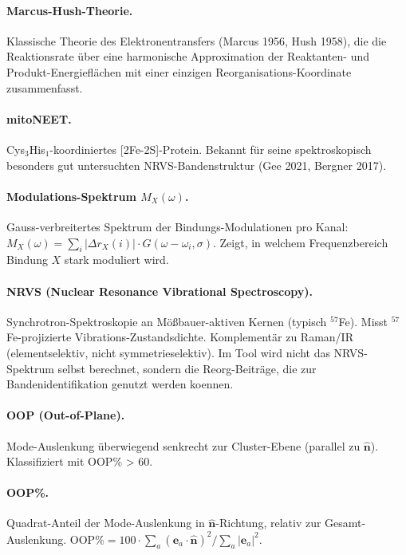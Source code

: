 \documentclass[11pt,a4paper,twoside]{article}
\theoremstyle{remark}
\begin{document}
\paragraph{Marcus-Hush-Theorie.}
Klassische Theorie des Elektronentransfers (Marcus 1956,
Hush 1958), die die Reaktionsrate \"uber eine harmonische
Approximation der Reaktanten- und Produkt-Energiefl\"achen mit
einer einzigen Reorganisations-Koordinate zusammenfasst.

\paragraph{mitoNEET.}
Cys$_3$His$_1$-koordiniertes [2Fe-2S]-Protein. Bekannt f\"ur
seine spektroskopisch besonders gut untersuchten NRVS-Bandenstruktur
(Gee 2021, Bergner 2017).

\paragraph{Modulations-Spektrum $M_X(\omega)$.}
Gauss-verbreitertes Spektrum der Bindungs-Modulationen pro Kanal:
$M_X(\omega) = \sum_i |\Delta r_X(i)| \cdot G(\omega - \omega_i,
\sigma)$. Zeigt, in welchem Frequenzbereich Bindung $X$ stark
moduliert wird.

\paragraph{NRVS (Nuclear Resonance Vibrational Spectroscopy).}
Synchrotron-Spektroskopie an M\"o{\ss}bauer-aktiven Kernen
(typisch $^{57}$Fe). Misst $^{57}$Fe-projizierte
Vibrations-Zustandsdichte. Komplement\"ar zu Raman/IR
(elementselektiv, nicht symmetrieselektiv). Im Tool wird
nicht das NRVS-Spektrum selbst berechnet, sondern die
Reorg-Beitr\"age, die zur Bandenidentifikation genutzt
werden koennen.

\paragraph{OOP (Out-of-Plane).}
Mode-Auslenkung \"uberwiegend senkrecht zur Cluster-Ebene
(parallel zu $\hat{\mathbf{n}}$). Klassifiziert mit OOP\% > 60.

\paragraph{OOP\%.}
Quadrat-Anteil der Mode-Auslenkung in $\hat{\mathbf{n}}$-Richtung,
relativ zur Gesamt-Auslenkung. $\text{OOP\%} = 100 \cdot \sum_a
(\mathbf{e}_a \cdot \hat{\mathbf{n}})^2 / \sum_a |\mathbf{e}_a|^2$.
\end{document}
